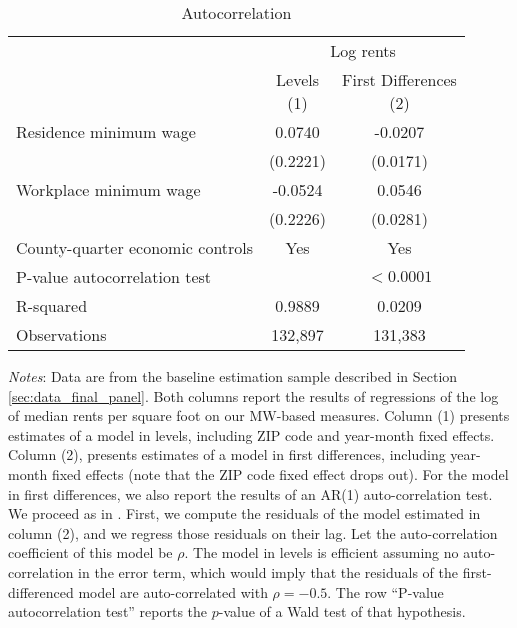 \begin{table}[hbt!] \centering
    \caption{Autocorrelation}
    \label{tab:autocorrelation}
    \begin{tabular}{@{}lcc@{}}
        \toprule
            & \multicolumn{2}{c}{Log rents}                             \\ \cmidrule(l){2-3} 
            & \shortstack{Levels\\(1)} 
            & \shortstack{First Differences\\(2)}                       \\ \midrule
        Residence minimum wage             &  0.0740   &  -0.0207              \\
                                           & (0.2221)  & (0.0171)             \\
        Workplace minimum wage             &  -0.0524   &  0.0546              \\
                                           & (0.2226)  & (0.0281)             \\ \midrule
        County-quarter economic controls   &  Yes   &  Yes              \\
        P-value autocorrelation test       &        &  $<0.0001$        \\
        R-squared                          &  0.9889   &  0.0209              \\
        Observations                       &  132,897  &  131,383             \\ \bottomrule
    \end{tabular}

    \begin{minipage}{.95\textwidth} \footnotesize
        \vspace{2mm}
        \textit{Notes}: 
        Data are from the baseline estimation sample described in Section 
        \ref{sec:data_final_panel}.
        Both columns report the results of regressions of the log of 
        median rents per square foot on our MW-based measures.
        Column (1) presents estimates of a model in levels, including 
        ZIP code and year-month fixed effects.
        Column (2), presents estimates of a model in first differences, 
        including year-month fixed effects 
        (note that the ZIP code fixed effect drops out).
        For the model in first differences, we also report the results of an 
        AR(1) auto-correlation test.
        We proceed as in \parencite[][Section 10.6.3]{wooldridge2010}.
        First, we compute the residuals of the model estimated in column (2), 
        and we regress those residuals on their lag.
        Let the auto-correlation coefficient of this model be $\rho$.
        The model in levels is efficient assuming no auto-correlation in the 
        error term, which would imply that the residuals of the 
        first-differenced model are auto-correlated with $\rho = -0.5$.
        The row ``P-value autocorrelation test'' reports the $p$-value of 
        a Wald test of that hypothesis.
    \end{minipage}
\end{table}
